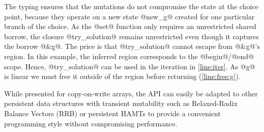 The typing ensures that the mutations do not compromise the state at
the choice point, because they operate on a new state @new_g@ created for one
particular branch of the choice.
As the @set@ function only requires an unrestricted shared borrow,
the closure @try_solution@ remains unrestricted even though
it captures the borrow @&g@.
The price is that @try_solution@ cannot escape from
@&g@'s region. In this example, the inferred region corresponds to the
@begin@/@end@ scope. 
Hence, @try_solution@ can be used in
the iteration in \cref{line:iter}.
As @g@ is linear we must free it outside of the region
before returning (\cref{line:free:g}).

While presented for copy-on-write arrays, the API
can easily be adapted to other persistent data structures with
transient mutability such as Relaxed-Radix Balance Vectors (RRB) \cite{DBLP:journals/pacmpl/Puente17}
or persistent HAMTs \cite{bagwell2001ideal,clojurehamt} to provide  a
convenient programming style without compromising performance.




